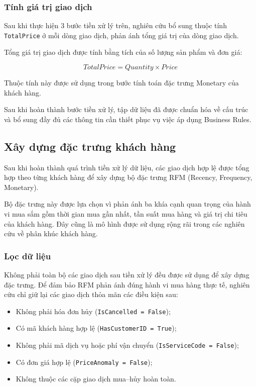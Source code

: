 \documentclass[12pt]{ai_conquer2026}
\begin{document}
\subsubsection{Tính giá trị giao dịch}

Sau khi thực hiện 3 bước tiền xử lý trên, nghiên cứu bổ sung thuộc tính \texttt{TotalPrice} ở mỗi dòng giao dịch, phản ánh tổng giá trị của dòng giao dịch.

Tổng giá trị giao dịch được tính bằng tích của số lượng sản phẩm và đơn giá:

\[
TotalPrice = Quantity \times Price
\]

Thuộc tính này được sử dụng trong bước tính toán đặc trưng Monetary của khách hàng.



Sau khi hoàn thành bước tiền xử lý, tập dữ liệu đã được chuẩn hóa về cấu trúc và bổ sung đầy đủ các thông tin cần thiết phục vụ việc áp dụng Business Rules. 

\subsection{Xây dựng đặc trưng khách hàng}

Sau khi hoàn thành quá trình tiền xử lý dữ liệu, các giao dịch hợp lệ được tổng hợp theo từng khách hàng để xây dựng bộ đặc trưng RFM (Recency, Frequency, Monetary). 

Bộ đặc trưng này được lựa chọn vì phản ánh ba khía cạnh quan trọng của hành vi mua sắm gồm thời gian mua gần nhất, tần suất mua hàng và giá trị chi tiêu của khách hàng. Đây cũng là mô hình được sử dụng rộng rãi trong các nghiên cứu về phân khúc khách hàng.

\subsubsection{Lọc dữ liệu}

Không phải toàn bộ các giao dịch sau tiền xử lý đều được sử dụng để xây dựng đặc trưng. Để đảm bảo RFM phản ánh đúng hành vi mua hàng thực tế, nghiên cứu chỉ giữ lại các giao dịch thỏa mãn các điều kiện sau:

\begin{itemize}
    \item Không phải hóa đơn hủy (\texttt{IsCancelled = False});
    \item Có mã khách hàng hợp lệ (\texttt{HasCustomerID = True});
    \item Không phải mã dịch vụ hoặc phí vận chuyển (\texttt{IsServiceCode = False});
    \item Có đơn giá hợp lệ (\texttt{PriceAnomaly = False});
    \item Không thuộc các cặp giao dịch mua--hủy hoàn toàn.
\end{itemize}
\end{document}
